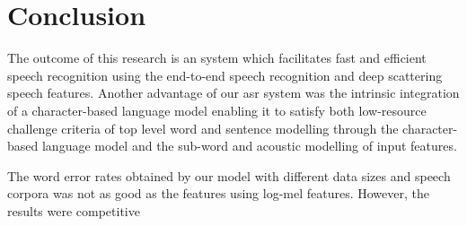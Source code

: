 \startblue
\section{Conclusion}

The outcome of this research is an  system which facilitates fast and efficient speech recognition using the end-to-end speech recognition and deep scattering speech features.  Another advantage of our \acrshort{asr} system was the intrinsic integration of a character-based language model enabling it to satisfy both low-resource challenge criteria of top level word and sentence modelling through the character-based language model and the sub-word and acoustic modelling of input features.

The word error rates obtained by our model with different data sizes and speech corpora was not as good as the features using log-mel features. However, the results were competitive 
 
\stopblue



